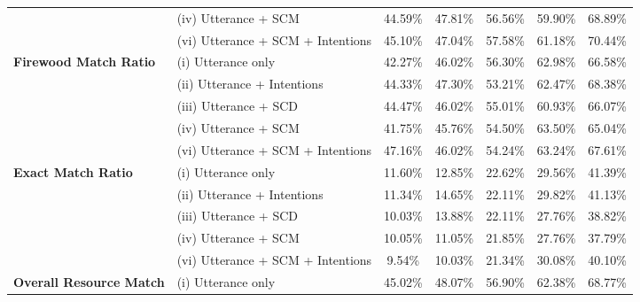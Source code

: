\begin{table*}[ht]
\begin{tabular}{llccccc}
 & (iv) Utterance + SCM & \cellcolor{red!25}44.59\% & \cellcolor{green!25}47.81\% & \cellcolor{red!25}56.56\% & \cellcolor{red!25}59.90\% & \cellcolor{red!25}68.89\% \\
 & (vi) Utterance + SCM + Intentions & \cellcolor{red!25}45.10\% & \cellcolor{green!25}47.04\% & \cellcolor{green!25}57.58\% & \cellcolor{green!25}61.18\% & \cellcolor{green!25}70.44\% \\
\midrule
\multirow{5}{*}{\textbf{Firewood Match Ratio}} & (i) Utterance only & 42.27\% & 46.02\% & 56.30\% & 62.98\% & 66.58\% \\
 & (ii) Utterance + Intentions & \cellcolor{green!25}44.33\% & \cellcolor{green!25}47.30\% & \cellcolor{red!25}53.21\% & \cellcolor{red!25}62.47\% & \cellcolor{green!25}68.38\% \\
 & (iii) Utterance + SCD & \cellcolor{green!25}44.47\% & \cellcolor{red!25}46.02\% & \cellcolor{red!25}55.01\% & \cellcolor{red!25}60.93\% & \cellcolor{red!25}66.07\% \\
 & (iv) Utterance + SCM & \cellcolor{red!25}41.75\% & \cellcolor{red!25}45.76\% & \cellcolor{red!25}54.50\% & \cellcolor{green!25}63.50\% & \cellcolor{red!25}65.04\% \\
 & (vi) Utterance + SCM + Intentions & \cellcolor{green!25}47.16\% & \cellcolor{red!25}46.02\% & \cellcolor{red!25}54.24\% & \cellcolor{green!25}63.24\% & \cellcolor{green!25}67.61\% \\
\midrule
\multirow{5}{*}{\textbf{Exact Match Ratio}} & (i) Utterance only & 11.60\% & 12.85\% & 22.62\% & 29.56\% & 41.39\% \\
 & (ii) Utterance + Intentions & \cellcolor{red!25}11.34\% & \cellcolor{green!25}14.65\% & \cellcolor{red!25}22.11\% & \cellcolor{green!25}29.82\% & \cellcolor{red!25}41.13\% \\
 & (iii) Utterance + SCD & \cellcolor{red!25}10.03\% & \cellcolor{green!25}13.88\% & \cellcolor{red!25}22.11\% & \cellcolor{red!25}27.76\% & \cellcolor{red!25}38.82\% \\
 & (iv) Utterance + SCM & \cellcolor{red!25}10.05\% & \cellcolor{red!25}11.05\% & \cellcolor{red!25}21.85\% & \cellcolor{red!25}27.76\% & \cellcolor{red!25}37.79\% \\
 & (vi) Utterance + SCM + Intentions & \cellcolor{red!25}9.54\% & \cellcolor{red!25}10.03\% & \cellcolor{red!25}21.34\% & \cellcolor{green!25}30.08\% & \cellcolor{red!25}40.10\% \\
\midrule
\multirow{5}{*}{\textbf{Overall Resource Match}} & (i) Utterance only & 45.02\% & 48.07\% & 56.90\% & 62.38\% & 68.77\% \\

\end{tabular}
\end{table*}
